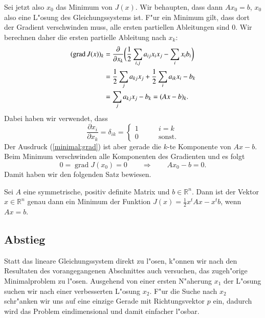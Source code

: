 Sei jetzt also $x_0$ das Minimum von $J(x)$.
Wir behaupten, dass dann $Ax_0=b$, $x_0$ also eine L"osung des
Gleichungssystems ist.
F"ur ein Minimum gilt, dass dort der Gradient verschwinden muss,
alle ersten partiellen Ableitungen sind $0$.
Wir berechnen daher die ersten partielle Ableitung nach $x_k$:
\begin{align}
(\operatorname{grad}J(x))_k
&=
\frac{\partial}{\partial x_k}\biggl(
\frac12\sum_{i,j}a_{ij}x_ix_j-\sum_ix_ib_i\biggr)
\notag
\\
&=
\frac12\sum_j a_{kj}x_j+\frac12\sum_i a_{ik}x_i-b_k
\notag
\\
&=\sum_j a_{kj}x_j-b_k = (Ax-b)_k.
\label{minimal:grad}
\end{align}
Dabei haben wir verwendet, dass
\[
\frac{\partial x_i}{\partial x_k}=\delta_{ik}=\begin{cases}1&\qquad i=k\\
0&\qquad\text{sonst.}\end{cases}
\]
Der Ausdruck (\ref{minimal:grad}) ist aber gerade die $k$-te Komponente
von $Ax-b$.
Beim Minimum verschwinden alle Komponenten des Gradienten und es folgt
\[
0=\operatorname{grad}J(x_0) = 0\qquad\Rightarrow\qquad Ax_0-b=0.
\]
Damit haben wir den folgenden Satz bewiesen.

\begin{satz}
Sei $A$ eine symmetrische, positiv definite Matrix und $b\in\mathbb R^n$.
Dann ist der Vektor $x\in\mathbb R^n$ genau dann ein Minimum 
der Funktion $J(x)=\frac12x^tAx-x^tb$, wenn $Ax=b$.
\end{satz}

\subsection{Abstieg}
Statt das lineare Gleichungssystem direkt zu l"osen, k"onnen wir nach
den Resultaten des vorangegangenen Abschnittes
auch versuchen, das zugeh"orige Minimalproblem zu l"osen. 
Ausgehend von einer ersten N"aherung $x_1$ der L"osung suchen wir nach einer 
verbesserten L"osung $x_2$.
F"ur die Suche nach $x_2$ 
schr"anken wir uns auf eine einzige Gerade mit Richtungsvektor $p$
ein, dadurch wird das Problem eindimensional und damit einfacher l"osbar.

